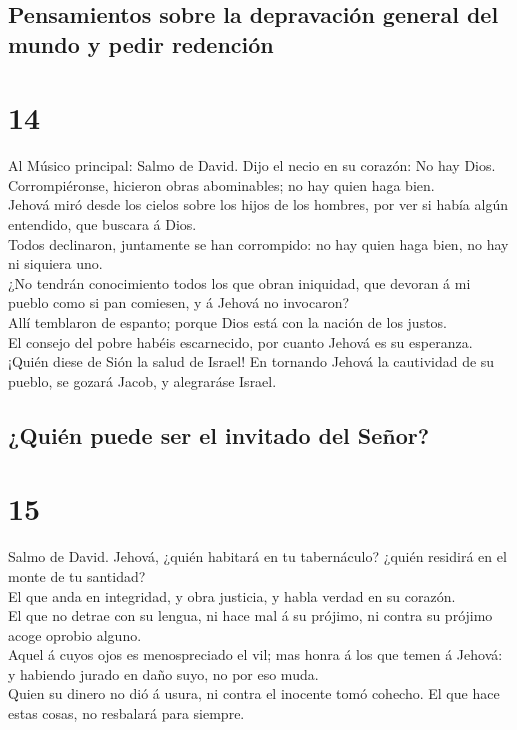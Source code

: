 \hypertarget{pensamientos-sobre-la-depravaciuxf3n-general-del-mundo-y-pedir-redenciuxf3n}{%
\subsection{Pensamientos sobre la depravación general del mundo y pedir
redención}\label{pensamientos-sobre-la-depravaciuxf3n-general-del-mundo-y-pedir-redenciuxf3n}}

\hypertarget{section-13}{%
\section{14}\label{section-13}}

 Al Músico principal: Salmo de David. Dijo el necio en su
corazón: No hay Dios. Corrompiéronse, hicieron obras abominables; no hay
quien haga bien.\\
 Jehová miró desde los cielos sobre los hijos de los
hombres, por ver si había algún entendido, que buscara á Dios.\\
 Todos declinaron, juntamente se han corrompido: no hay
quien haga bien, no hay ni siquiera uno.\\
 ¿No tendrán conocimiento todos los que obran iniquidad,
que devoran á mi pueblo como si pan comiesen, y á Jehová no invocaron?\\
 Allí temblaron de espanto; porque Dios está con la nación
de los justos.\\
 El consejo del pobre habéis escarnecido, por cuanto
Jehová es su esperanza.\\
 ¡Quién diese de Sión la salud de Israel! En tornando
Jehová la cautividad de su pueblo, se gozará Jacob, y alegraráse Israel.

\hypertarget{quiuxe9n-puede-ser-el-invitado-del-seuxf1or}{%
\subsection{¿Quién puede ser el invitado del
Señor?}\label{quiuxe9n-puede-ser-el-invitado-del-seuxf1or}}

\hypertarget{section-14}{%
\section{15}\label{section-14}}

 Salmo de David. Jehová, ¿quién habitará en tu
tabernáculo? ¿quién residirá en el monte de tu santidad?\\
 El que anda en integridad, y obra justicia, y habla
verdad en su corazón.\\
 El que no detrae con su lengua, ni hace mal á su prójimo,
ni contra su prójimo acoge oprobio alguno.\\
 Aquel á cuyos ojos es menospreciado el vil; mas honra á
los que temen á Jehová: y habiendo jurado en daño suyo, no por eso
muda.\\
 Quien su dinero no dió á usura, ni contra el inocente
tomó cohecho. El que hace estas cosas, no resbalará para siempre.

